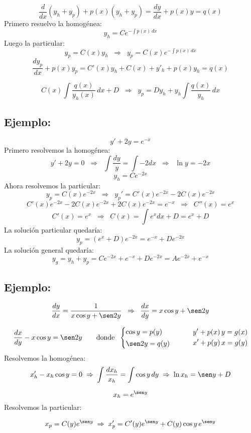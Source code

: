 \documentclass[a4paper,12pt]{article}
\begin{document}
\[
\frac{d}{dx}(y_h+y_p)+p(x)(y_h+y_p)=\frac{dy}{dx}+p(x)y=q(x)
\]
Primero resuelvo la homogénea:
\[
y_h = C e^{-\int p(x)\,dx}
\]
Luego la particular:
\[
y_p = C(x)y_h \;\;\Rightarrow\;\; y_p = C(x)e^{-\int p(x)\,dx}
\]
\[
\frac{dy_p}{dx}+p(x)y_p = C'(x)y_h + C(x)+y'_h+p(x)y_h=q(x)
\]

\[
C(x)\int\frac{q(x)}{y_h(x)}\,dx+D 
\;\;\Rightarrow\;\;
y_p=Dy_h+y_h\int \frac{q(x)}{y_h}\,dx
\]

\subsection*{Ejemplo:}
\vspace{-1.5em}
\[
y' + 2y = e^{-x}
\]
Primero resolvemos la homogénea:
\[
y' + 2y = 0 \;\;\Rightarrow\;\; \int \frac{dy}{y} = \int -2dx 
\;\;\Rightarrow\;\; \ln y = -2x
\]
\[
y_h = Ce^{-2x}
\]
\newpage
\noindent
Ahora resolvemos la particular:
\[
y_p = C(x)e^{-2x} \;\;\Rightarrow\;\; 
y_p' = C'(x)e^{-2x} - 2C(x)e^{-2x}
\]
\[
C'(x)e^{-2x} - 2C(x)e^{-2x} + 2C(x)e^{-2x} = e^{-x} 
\;\;\Rightarrow\;\; C''(x) = e^{x}
\]
\[
C'(x) = e^x \;\;\Rightarrow\;\; C(x) = \int e^x dx + D = e^x + D
\]
La solución particular quedaría:
\[
y_p = (e^x + D)e^{-2x} = e^{-x} + De^{-2x}
\]
La solución general quedaría:
\[
y_g = y_h + y_p = Ce^{-2x} + e^{-x} + De^{-2x}
= Ae^{-2x} + e^{-x}
\]

\subsection*{Ejemplo:}
\vspace{-1.0em}
\[
\frac{dy}{dx}=\frac{1}{x\cos y+\sen 2y}
\;\;\Rightarrow\;\;
\frac{dx}{dy}=x\cos y+\sen 2y
\]

\[
\frac{dx}{dy}-x\cos y=\sen 2y
\qquad
\text{donde }\;
\begin{cases}
\cos y = p(y)\\[2pt]
\sen 2y = q(y)
\end{cases}
\qquad
\begin{aligned}
&y'+p(x)\,y=g(x)\\
&x'+p(y)\,x=g(y)
\end{aligned}
\]
Resolvemos la homogénea:
\[
x_h'-x_h\cos y=0
\;\Rightarrow\;
\int \frac{dx_h}{x_h}=\int \cos y\,dy
\;\Rightarrow\;
\ln x_h=\sen y + D
\]

\[
x_h=e^{\sen y}
\]
Resolvemos la particular:

\[
x_p=C(y)e^{\sen y}
\;\Rightarrow\;
x_p'=C'(y)e^{\sen y}+C(y)\cos y\,e^{\sen y}
\]
\end{document}

